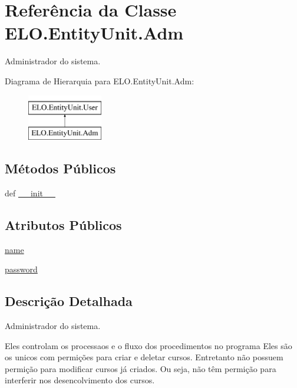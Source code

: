 \hypertarget{classELO_1_1EntityUnit_1_1Adm}{\section{Referência da Classe E\-L\-O.\-Entity\-Unit.\-Adm}
\label{d3/d3a/classELO_1_1EntityUnit_1_1Adm}
}


Administrador do sistema.  


Diagrama de Hierarquia para E\-L\-O.\-Entity\-Unit.\-Adm\-:\begin{figure}[H]
\begin{center}
\leavevmode
\includegraphics[height=2.000000cm]{d3/d3a/classELO_1_1EntityUnit_1_1Adm}
\end{center}
\end{figure}
\subsection*{Métodos Públicos}
\begin{DoxyCompactItemize}
\item 
def \hyperlink{classELO_1_1EntityUnit_1_1Adm_a01e2f40a6af7208831e2b35bf155dc9e}{\-\_\-\-\_\-init\-\_\-\-\_\-}
\end{DoxyCompactItemize}
\subsection*{Atributos Públicos}
\begin{DoxyCompactItemize}
\item 
\hyperlink{classELO_1_1EntityUnit_1_1Adm_a12f7aaf17dc6e036186e7757244cd12a}{name}
\item 
\hyperlink{classELO_1_1EntityUnit_1_1Adm_aed97c3f4efa1320ef99b3794b51f8e5e}{password}
\end{DoxyCompactItemize}


\subsection{Descrição Detalhada}
Administrador do sistema. 

Eles controlam os processaos e o fluxo dos procedimentos no programa Eles são os unicos com permições para criar e deletar cursos. Entretanto não possuem permição para modificar cursos já criados. Ou seja, não têm permição para interferir nos desencolvimento dos cursos. 

